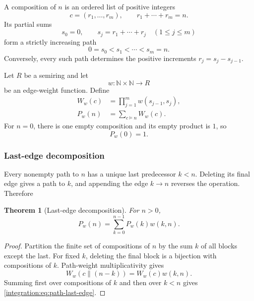 \documentclass[11pt,oneside]{article}
\newtheorem{theorem}{Theorem}[section]
\theoremstyle{definition}
\theoremstyle{remark}
\newcommand{\N}{\mathbb N}
\begin{document}
A composition of $n$ is an ordered list of positive integers
\begin{equation}
 c=(r_1,\ldots,r_m),
 \qquad
 r_1+\cdots+r_m=n.
 \label{integration:eq:composition}
\end{equation}
Its partial sums
\begin{equation}
 s_0=0,
 \qquad
 s_j=r_1+\cdots+r_j
 \quad(1\le j\le m)
 \label{integration:eq:composition-partial-sums}
\end{equation}
form a strictly increasing path
\begin{equation}
 0=s_0<s_1<\cdots<s_m=n.
 \label{integration:eq:increasing-path}
\end{equation}
Conversely, every such path determines the positive increments $r_j=s_j-s_{j-1}$.

Let $R$ be a semiring and let
\begin{equation}
 w:\N\times\N\to R
 \label{integration:eq:generic-edge-weight}
\end{equation}
be an edge-weight function.  Define
\begin{align}
 W_w(c)&=\prod_{j=1}^{m}w(s_{j-1},s_j),                    \label{integration:eq:path-weight}\\
 P_w(n)&=\sum_{c\models n}W_w(c).                          \label{integration:eq:path-sum}
\end{align}
For $n=0$, there is one empty composition and its empty product is $1$, so
\begin{equation}
 P_w(0)=1.
 \label{integration:eq:path-sum-zero}
\end{equation}

\subsubsection{Last-edge decomposition}

Every nonempty path to $n$ has a unique last predecessor $k<n$.  Deleting its final edge
gives a path to $k$, and appending the edge $k\to n$ reverses the operation.  Therefore

\begin{theorem}[Last-edge decomposition]
\label{integration:thm:path-last-edge}
For $n>0$,
\begin{equation}
 P_w(n)=\sum_{k=0}^{n-1}P_w(k)w(k,n).
 \label{integration:eq:path-last-edge}
\end{equation}
\end{theorem}

\begin{proof}
Partition the finite set of compositions of $n$ by the sum $k$ of all blocks except the last.
For fixed $k$, deleting the final block is a bijection with compositions of $k$.  Path-weight
multiplicativity gives
\[
 W_w(c\mathbin{\|}(n-k))=W_w(c)w(k,n).
\]
Summing first over compositions of $k$ and then over $k<n$ gives
\eqref{integration:eq:path-last-edge}.
\end{proof}
\end{document}
